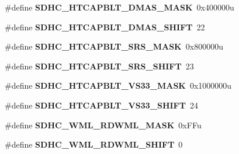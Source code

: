 \begin{DoxyCompactItemize}
\item 
\#define {\bfseries S\+D\+H\+C\+\_\+\+H\+T\+C\+A\+P\+B\+L\+T\+\_\+\+D\+M\+A\+S\+\_\+\+M\+A\+SK}~0x400000u\hypertarget{group__SDHC__Register__Masks_ga5252cbd3675e74a01efa99cf6b754c8a}{}\label{group__SDHC__Register__Masks_ga5252cbd3675e74a01efa99cf6b754c8a}

\item 
\#define {\bfseries S\+D\+H\+C\+\_\+\+H\+T\+C\+A\+P\+B\+L\+T\+\_\+\+D\+M\+A\+S\+\_\+\+S\+H\+I\+FT}~22\hypertarget{group__SDHC__Register__Masks_gab0236dd93e36239ae39f6b813eeb11a1}{}\label{group__SDHC__Register__Masks_gab0236dd93e36239ae39f6b813eeb11a1}

\item 
\#define {\bfseries S\+D\+H\+C\+\_\+\+H\+T\+C\+A\+P\+B\+L\+T\+\_\+\+S\+R\+S\+\_\+\+M\+A\+SK}~0x800000u\hypertarget{group__SDHC__Register__Masks_ga62e346d8925d26124eb284b4ebf984d3}{}\label{group__SDHC__Register__Masks_ga62e346d8925d26124eb284b4ebf984d3}

\item 
\#define {\bfseries S\+D\+H\+C\+\_\+\+H\+T\+C\+A\+P\+B\+L\+T\+\_\+\+S\+R\+S\+\_\+\+S\+H\+I\+FT}~23\hypertarget{group__SDHC__Register__Masks_ga47c009f4b74a67296231bb73fa1c74f8}{}\label{group__SDHC__Register__Masks_ga47c009f4b74a67296231bb73fa1c74f8}

\item 
\#define {\bfseries S\+D\+H\+C\+\_\+\+H\+T\+C\+A\+P\+B\+L\+T\+\_\+\+V\+S33\+\_\+\+M\+A\+SK}~0x1000000u\hypertarget{group__SDHC__Register__Masks_gaefb26b10e16d07a763c3a6aa87d64c77}{}\label{group__SDHC__Register__Masks_gaefb26b10e16d07a763c3a6aa87d64c77}

\item 
\#define {\bfseries S\+D\+H\+C\+\_\+\+H\+T\+C\+A\+P\+B\+L\+T\+\_\+\+V\+S33\+\_\+\+S\+H\+I\+FT}~24\hypertarget{group__SDHC__Register__Masks_ga134420d6cffd9c730caecd7cc64f1d41}{}\label{group__SDHC__Register__Masks_ga134420d6cffd9c730caecd7cc64f1d41}

\item 
\#define {\bfseries S\+D\+H\+C\+\_\+\+W\+M\+L\+\_\+\+R\+D\+W\+M\+L\+\_\+\+M\+A\+SK}~0x\+F\+Fu\hypertarget{group__SDHC__Register__Masks_gae6b31e76805f36f9903c70818642decc}{}\label{group__SDHC__Register__Masks_gae6b31e76805f36f9903c70818642decc}

\item 
\#define {\bfseries S\+D\+H\+C\+\_\+\+W\+M\+L\+\_\+\+R\+D\+W\+M\+L\+\_\+\+S\+H\+I\+FT}~0\hypertarget{group__SDHC__Register__Masks_gaccbe2485e8ba11877a5d0c45efef3cf5}{}\label{group__SDHC__Register__Masks_gaccbe2485e8ba11877a5d0c45efef3cf5}


\end{DoxyCompactItemize}
